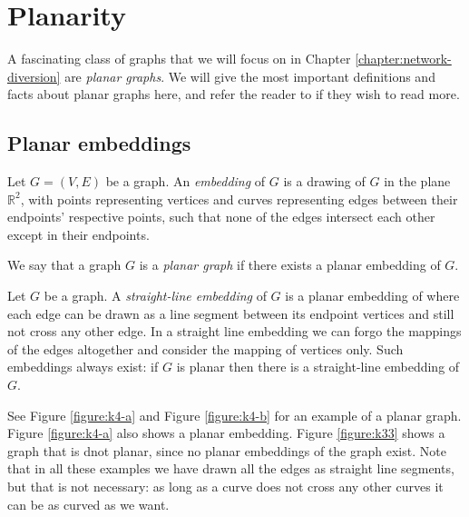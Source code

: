 \section{Planarity}
\label{section:planar-graphs}
A fascinating class of graphs that we will focus on in Chapter \ref{chapter:network-diversion} are \emph{planar graphs}. We will give the most important definitions and facts about planar graphs here, and refer the reader to \cite{source:planar_graphs} if they wish to read more.

\subsection{Planar embeddings}
\begin{definition}[Embedding]
    Let $G = (V,E)$ be a graph. An \emph{embedding} of $G$ is a drawing of $G$ in the plane $\mathbb{R}^2$, with points representing vertices and curves representing edges between their endpoints' respective points, such that none of the edges intersect each other except in their endpoints.
\end{definition}

\begin{definition}
    We say that a graph $G$ is a \emph{planar graph} if there exists a planar embedding of $G$.
\end{definition}

\begin{definition}
    Let $G$ be a graph. A \emph{straight-line embedding} of $G$ is a planar embedding of where each edge can be drawn as a line segment between its endpoint vertices and still not cross any other edge. In a straight line embedding we can forgo the mappings of the edges altogether and consider the mapping of vertices only. Such embeddings always exist: if $G$ is planar then there is a straight-line embedding of $G$.
\end{definition}

See Figure \ref{figure:k4-a} and Figure \ref{figure:k4-b} for an example of a planar graph. Figure \ref{figure:k4-a} also shows a planar embedding. Figure \ref{figure:k33} shows a graph that is dnot planar, since no planar embeddings of the graph exist. Note that in all these examples we have drawn all the edges as straight line segments, but that is not necessary: as long as a curve does not cross any other curves it can be as curved as we want.

